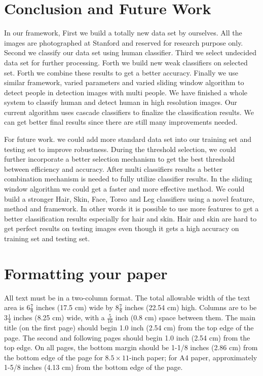 \documentclass[10pt,twocolumn,letterpaper]{article}
\begin{document}
\section{Conclusion and Future Work}
In our framework, First we build a totally new data set by ourselves. All the images are photographed at Stanford and reserved for research purpose only. Second we classify our data set using human classifier. Third we select undecided data set for further processing. Forth we build new weak classifiers on selected set. Forth we combine these results to get a better accuracy. Finally we use similar framework, varied parameters and varied sliding window algorithm to detect people in detection images with multi people. We have finished a whole system to classify human and detect human in high resolution images. Our current algorithm uses cascade classifiers to finalize the classification results. We can get better final results since there are still many improvements needed. 

For future work. we could add more standard data set into our training set and testing set to improve robustness. During the threshold selection, we could further incorporate a better selection mechanism to get the best threshold between efficiency and accuracy. After multi classifiers results a better combination mechanism is needed to fully utilize classifier results. In the sliding window algorithm we could get a faster and more effective method. We could build a stronger Hair, Skin, Face, Torso and Leg classifiers using a novel feature, method and framework.
In other words it is possible to use more features to get a better classification results especially for hair and skin. Hair and skin are hard to 
get perfect results on testing images even though it gets a high accuracy on training set and testing set. 

\section{Formatting your paper}

All text must be in a two-column format. The total allowable width of the
text area is $6\frac78$ inches (17.5 cm) wide by $8\frac78$ inches (22.54
cm) high. Columns are to be $3\frac14$ inches (8.25 cm) wide, with a
$\frac{5}{16}$ inch (0.8 cm) space between them. The main title (on the
first page) should begin 1.0 inch (2.54 cm) from the top edge of the
page. The second and following pages should begin 1.0 inch (2.54 cm) from
the top edge. On all pages, the bottom margin should be 1-1/8 inches (2.86
cm) from the bottom edge of the page for $8.5 \times 11$-inch paper; for A4
paper, approximately 1-5/8 inches (4.13 cm) from the bottom edge of the
page.
\end{document}
